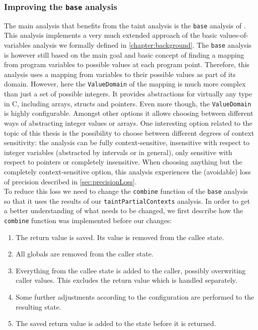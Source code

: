     \subsubsection{Improving the \texttt{base} analysis}
      The main analysis that benefits from the taint analysis is the \texttt{base} analysis of \gob. This analysis implements a very much extended approach of the basic values-of-variables analysis we formally defined in \autoref{chapter:background}. The \texttt{base} analysis is however still based on the main goal and basic concept of finding a mapping from program variables to possible values at each program point. Therefore, this analysis uses a mapping from variables to their possible values as part of its domain. However, here the \texttt{ValueDomain} of the mapping is much more complex than just a set of possible integers. It provides abstractions for virtually any type in C, including arrays, structs and pointers. Even more though, the \texttt{ValueDomain} is highly configurable. Amongst other options it allows choosing between different ways of abstracting integer values or arrays. One interesting option related to the topic of this thesis is the possibility to choose between different degrees of context sensitivity: the analysis can be fully context-sensitive, insensitive with respect to integer variables (abstracted by intervals or in general), only sensitive with respect to pointers or completely insensitive. When choosing anything but the completely context-sensitive option, this analysis experiences the (avoidable) loss of precision described in \autoref{sec:precisionLoss}.\\
      To reduce this loss we need to change the \texttt{combine} function of the \texttt{base} analysis so that it uses the results of our \texttt{taintPartialContexts} analysis. In order to get a better understanding of what needs to be changed, we first describe how the \texttt{combine} function was implemented before our changes:
      \begin{enumerate}
        \item The return value is saved. Its value is removed from the callee state.
        \item All globals are removed from the caller state.
        \item Everything from the callee state is added to the caller, possibly overwriting caller values. This excludes the return value which is handled separately.
        \item Some further adjustments according to the configuration are performed to the resulting state.
        \item The saved return value is added to the state before it is returned.
      \end{enumerate}
